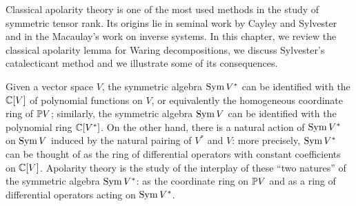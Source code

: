 Classical apolarity theory is one of the most used methods in the study of symmetric tensor rank. Its origins lie in seminal work by Cayley \cite{Cay45} and Sylvester \cite{Syl52,Syl53} and in the Macaulay's work on inverse systems. In this chapter, we review the classical apolarity lemma for Waring decompositions, we discuss Sylvester's catalecticant method and we illustrate some of its consequences.

Given a vector space $V$, the symmetric algebra $\operatorname{Sym} V^*$ can be identified with the $\mathbb{C}[V]$ of polynomial functions on $V$, or equivalently the homogeneous coordinate ring of $\mathbb{P} V$; similarly, the symmetric algebra $\operatorname{Sym} V$ can be identified with the polynomial ring $\mathbb{C}[V^*]$. On the other hand, there is a natural action of $\operatorname{Sym} V^*$ on $\operatorname{Sym} V$ induced by the natural pairing of $V^*$ and $V$: more precisely, $\operatorname{Sym} V^*$ can be thought of as the ring of differential operators with constant coefficients on $\mathbb{C}[V]$. Apolarity theory is the study of the interplay of these ``two natures'' of the symmetric algebra $\operatorname{Sym} V^*$: as the coordinate ring on $\mathbb{P} V$ and as a ring of differential operators acting on $\operatorname{Sym} V^*$.

